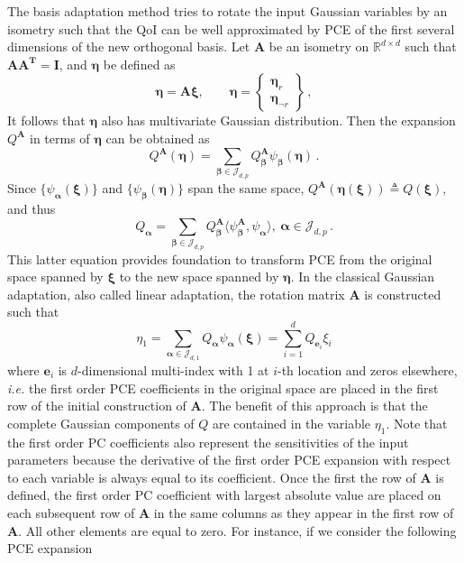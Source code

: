 The basis adaptation method tries to rotate the input Gaussian variables by an isometry such that the QoI can be well approximated by PCE of the first several dimensions of the new orthogonal basis. Let $\bm A$ be an isometry on $\mathbb{R}^{d\times d}$ such that $\bm{AA^T}=\bm I$, and $\bm \eta$ be defined as
\begin{equation}
\bm \eta = \bm{A\xi}, \qquad \bm \eta = \begin{Bmatrix} \bm{\eta}_r\\ \bm{\eta }_{\neg r}\end{Bmatrix} \,,
\end{equation}
It follows that $\bm{\eta}$ also has multivariate Gaussian distribution. Then the expansion ${Q}^{\bm A}$ in terms of $\bm{\eta}$ can be obtained as
\begin{equation}
{Q}^{\bm A}(\bm{\eta}) = \sum_{\bm{\beta}\in\mathcal{J}_{d,p}}Q_{\bm{\beta}}^{\bm A}\psi_{\bm \beta}(\bm \eta) \,.
\end{equation}
Since $\{{\psi_{ \bm{\alpha}}(\bm{\xi})}\}$ and $\{{\psi_{ \bm{\beta}}(\bm{\eta})}\}$ span the same space, ${Q}^{\bm{A}}(\bm{\eta}(\bm{\xi})) \triangleq {Q}(\bm{\xi})$, and thus
\begin{equation}\label{eq14}
Q_{\bm{\alpha}} = \sum_{\bm{\beta}\in\mathcal{J}_{d,p}}Q_{\bm{\beta}}^{\bm A}\langle\psi_{\bm \beta}^{\bm A},\psi_{\bm \alpha}\rangle, \ \bm{\alpha}\in \mathcal{J}_{d,p}\,.
\end{equation}
This latter equation provides foundation to transform PCE from the original space spanned by $\bm{\xi}$ to the new space spanned by $\bm{\eta}$. In the classical Gaussian adaptation, 
also called linear adaptation, the rotation matrix $\bm A$ is constructed such that
\begin{equation}\label{eq15}
\eta_1 = \sum_{\bm{\alpha}\in\mathcal{J}_{d,1}} Q_{\bm{\alpha}}\psi_{\bm \alpha}(\bm{\xi}) = \sum_{i=1}^{d}Q_{\bm e_i} \xi_i
\end{equation}
where $\bm e_i$ is $d$-dimensional multi-index with 1 at $i$-th location and zeros elsewhere, \textit{i.e.} the first order PCE coefficients in the original space are placed in the first row of 
the initial construction of $\bm{A}$. The benefit of this approach is that the complete Gaussian components of $Q$ are contained in the variable $\eta_1$. Note that the first order PC coefficients also represent the sensitivities of the input parameters because the derivative of the first order PCE expansion with respect to each variable is always equal to its coefficient. Once the first the row of $\bm{A}$ is defined, the first order PC coefficient with largest absolute value are placed on each subsequent row of $\bm{A}$ in the same columns as they appear in the first row of $\bm{A}$. All other elements are equal to zero. For instance, if we consider the following PCE expansion
